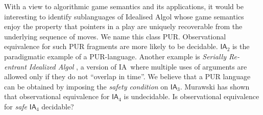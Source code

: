 \documentclass{llncs}
\newcommand\ialgol{\textsf{IA}}
\begin{document}
With a view to algorithmic game semantics and its applications, it
would be interesting to identify sublanguages of Idealised Algol whose
game semantics enjoy the property that pointers in a play are uniquely
recoverable from the underlying sequence of moves. We name this class
PUR. Observational equivalence for such PUR fragments are more likely to be
decidable. $\ialgol_2$ is the paradigmatic example of a
PUR-language. Another example is \emph{Serially Re-entrant Idealized
  Algol} \cite{abramsky:mchecking_ia}, a version of \ialgol\ where
multiple uses of arguments are allowed only if they do not ``overlap
in time''.  We believe that a PUR language can be obtained by imposing
the \emph{safety condition} on $\ialgol_3$. Murawski \cite{Murawski2003} has
shown that observational equivalence for $\ialgol_4$ is
undecidable. Is observational equivalence for \emph{safe} $\ialgol_4$
decidable?

%
%


\end{document}
